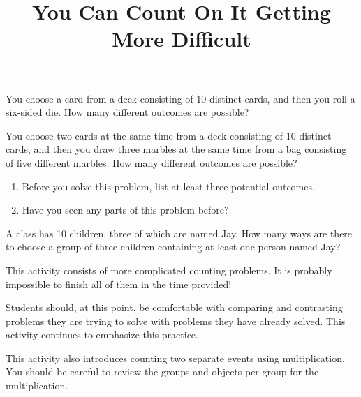 \documentclass[nooutcomes,noauthor]{ximera}
\title{You Can Count On It Getting More Difficult}
\begin{document}
\begin{abstract}
\end{abstract}
\maketitle





\begin{problem}
You choose a card from a deck consisting of 10 distinct cards, and then you roll a six-sided die.  How many different outcomes are possible?
\end{problem}

\begin{problem}
You choose two cards at the same time from a deck consisting of 10 distinct cards, and then you draw three marbles at the same time from a bag consisting of five different marbles.  How many different outcomes are possible?
\begin{enumerate}
\item Before you solve this problem, list at least three potential outcomes.
\item Have you seen any parts of this problem before?
\end{enumerate}
\end{problem}

\begin{problem}
A class has 10 children, three of which are named Jay.  How many ways are there to choose a group of three children containing at least one person named Jay?
\end{problem}


\newpage

\begin{instructorNotes}
This activity consists of more complicated counting problems.  It is probably impossible to finish all of them in the time provided!

Students should, at this point, be comfortable with comparing and contrasting problems they are trying to solve with problems they have already solved.  This activity continues to emphasize this practice.

This activity also introduces counting two separate events using multiplication.  You should be careful to review the groups and objects per group for the multiplication.
\end{instructorNotes}
\end{document}
